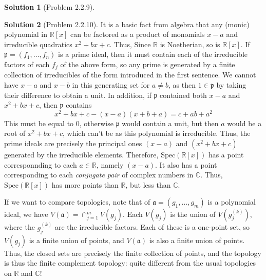 \documentclass[aps,pra,showpacs,notitlepage,onecolumn,superscriptaddress,nofootinbib]{revtex4-1}
\theoremstyle{definition}
\newtheorem{solution}{Solution}[section]
\begin{document}
\begin{solution}[Problem 2.2.9]

  \end{solution}

\begin{solution}[Problem 2.2.10]
  It is a basic fact from algebra that any (monic) polynomial in $\mathbb{R}[x]$ can be factored as a product of monomials $x - a$ and irreducible quadratics $x^2 + bx + c$. Thus, Since $\mathbb{R}$ is
  Noetherian, so is $\mathbb{R}[x]$. If $\mathfrak{p} = (f_1, \dots, f_n)$ is a prime ideal, then it must contain each of the irreducible factors of each $f_j$ of the above form, so any prime is generated
  by a finite collection of irreducibles of the form introduced in the first sentence. We cannot have $x - a$ and $x - b$ in this generating set for $a \neq b$, as then $1 \in \mathfrak{p}$ by taking their difference
  to obtain a unit. In addition, if $\mathfrak{p}$ contained both $x - a$ and $x^2 + bx + c$, then $\mathfrak{p}$ contains
  \begin{equation}
    x^2 + bx + c - (x - a)(x + b + a) = c + ab + a^2
    \end{equation}
  This must be equal to $0$, otherwise $\mathfrak{p}$ would contain a unit, but then $a$ would be a root of $x^2 + bx + c$, which can't be as this polynomial is irreducible. Thus, the prime ideals are precisely the
  principal ones $(x - a)$ and $(x^2 + bx + c)$ generated by the irreducible elements. Therefore, $\text{Spec}(\mathbb{R}[x])$ has a point corresponnding to each $a \in \mathbb{R}$, namely $(x - a)$. It also
  has a point corresponding to each \emph{conjugate pair} of complex numbers in $\mathbb{C}$. Thus, $\text{Spec}(\mathbb{R}[x])$ has more points than $\mathbb{R}$, but less than $\mathbb{C}$.

  If we want to compare topologies, note that of $\mathfrak{a} = (g_1, \dots, g_m)$ is a polynomial ideal, we have $V(\mathfrak{a}) = \cap_{j = 1}^{m} V(g_j)$. Each $V(g_j)$ is the union of $V(g_j^{(k)})$, where
  the $g_j^{(k)}$ are the irreducible factors. Each of these is a one-point set, so $V(g_j)$ is a finite union of points, and $V(\mathfrak{a})$ is also a finite union of points. Thus, the closed sets are precisely
  the finite collection of points, and the topology is thus the finite complement topology: quite different from the usual topologies on $\mathbb{R}$ and $\mathbb{C}$!
  \end{solution}
\end{document}
